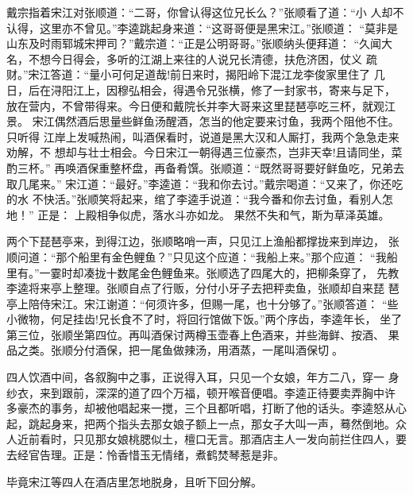 戴宗指着宋江对张顺道：“二哥，你曾认得这位兄长么？”张顺看了道：“小
人却不认得，这里亦不曾见。”李逵跳起身来道：“这哥哥便是黑宋江。”张顺道：
“莫非是山东及时雨郓城宋押司？”戴宗道：“正是公明哥哥。”张顺纳头便拜道：
“久闻大名，不想今日得会，多听的江湖上来往的人说兄长清德，扶危济困，仗义
疏财。”宋江答道：“量小可何足道哉!前日来时，揭阳岭下混江龙李俊家里住了
几日，后在浔阳江上，因穆弘相会，得遇令兄张横，修了一封家书，寄来与足下，
放在营内，不曾带得来。今日便和戴院长并李大哥来这里琵琶亭吃三杯，就观江景。
宋江偶然酒后思量些鲜鱼汤醒酒，怎当的他定要来讨鱼，我两个阻他不住。只听得
江岸上发喊热闹，叫酒保看时，说道是黑大汉和人厮打，我两个急急走来劝解，不
想却与壮士相会。今日宋江一朝得遇三位豪杰，岂非天幸!且请同坐，菜酌三杯。”
再唤酒保重整杯盘，再备肴馔。张顺道：“既然哥哥要好鲜鱼吃，兄弟去取几尾来。”
宋江道：“最好。”李逵道：“我和你去讨。”戴宗喝道：“又来了，你还吃的水
不快活。”张顺笑将起来，绾了李逵手说道：“我今番和你去讨鱼，看别人怎地！”
正是：
上殿相争似虎，落水斗亦如龙。
果然不失和气，斯为草泽英雄。

两个下琵琶亭来，到得江边，张顺略哨一声，只见江上渔船都撑拢来到岸边，
张顺问道：“那个船里有金色鲤鱼？”只见这个应道：“我船上来。”那个应道：
“我船里有。”一霎时却凑拢十数尾金色鲤鱼来。张顺选了四尾大的，把柳条穿了，
先教李逵将来亭上整理。张顺自点了行贩，分付小牙子去把秤卖鱼，张顺却自来琵
琶亭上陪侍宋江。宋江谢道：“何须许多，但赐一尾，也十分够了。”张顺答道：
“些小微物，何足挂齿!兄长食不了时，将回行馆做下饭。”两个序齿，李逵年长，
坐了第三位，张顺坐第四位。再叫酒保讨两樽玉壶春上色酒来，并些海鲜、按酒、
果品之类。张顺分付酒保，把一尾鱼做辣汤，用酒蒸，一尾叫酒保切。

四人饮酒中间，各叙胸中之事，正说得入耳，只见一个女娘，年方二八，穿一
身纱衣，来到跟前，深深的道了四个万福，顿开喉音便唱。李逵正待要卖弄胸中许
多豪杰的事务，却被他唱起来一搅，三个且都听唱，打断了他的话头。李逵怒从心
起，跳起身来，把两个指头去那女娘子额上一点，那女子大叫一声，蓦然倒地。众
人近前看时，只见那女娘桃腮似土，檀口无言。那酒店主人一发向前拦住四人，要
去经官告理。正是：怜香惜玉无情绪，煮鹤焚琴惹是非。

毕竟宋江等四人在酒店里怎地脱身，且听下回分解。
